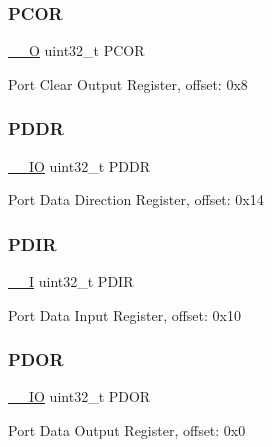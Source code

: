 \subsubsection{\texorpdfstring{PCOR}{PCOR}}
{\footnotesize\ttfamily \mbox{\hyperlink{core__cm0plus_8h_a7e25d9380f9ef903923964322e71f2f6}{\+\_\+\+\_\+O}} uint32\+\_\+t P\+C\+OR}

Port Clear Output Register, offset\+: 0x8 \mbox{\label{struct_f_g_p_i_o___type_a441a96d3febd01d841b24561b4d036a3}} 
\subsubsection{\texorpdfstring{PDDR}{PDDR}}
{\footnotesize\ttfamily \mbox{\hyperlink{core__cm0plus_8h_aec43007d9998a0a0e01faede4133d6be}{\+\_\+\+\_\+\+IO}} uint32\+\_\+t P\+D\+DR}

Port Data Direction Register, offset\+: 0x14 \mbox{\label{struct_f_g_p_i_o___type_a1013b95ac09a1205ba0528ad32ad1edc}} 
\subsubsection{\texorpdfstring{PDIR}{PDIR}}
{\footnotesize\ttfamily \mbox{\hyperlink{core__cm0plus_8h_af63697ed9952cc71e1225efe205f6cd3}{\+\_\+\+\_\+I}} uint32\+\_\+t P\+D\+IR}

Port Data Input Register, offset\+: 0x10 \mbox{\label{struct_f_g_p_i_o___type_aef77a53fb6962f329978c788b3c1e637}} 
\subsubsection{\texorpdfstring{PDOR}{PDOR}}
{\footnotesize\ttfamily \mbox{\hyperlink{core__cm0plus_8h_aec43007d9998a0a0e01faede4133d6be}{\+\_\+\+\_\+\+IO}} uint32\+\_\+t P\+D\+OR}

Port Data Output Register, offset\+: 0x0 \mbox{\label{struct_f_g_p_i_o___type_a3aa2323e3b596f8c9f191acb2ad7f75d}} 
